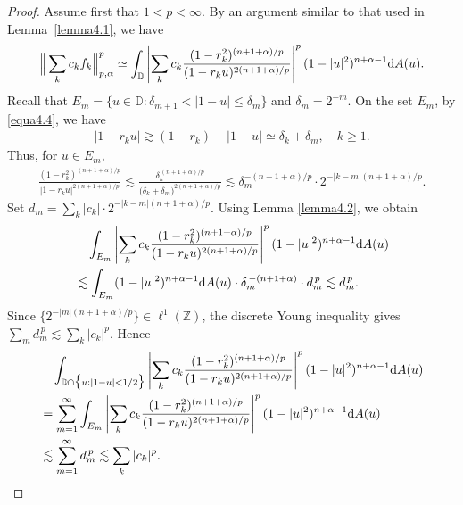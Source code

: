 \documentclass[preprint,12pt,times]{elsarticle}
\theoremstyle{definition}
\theoremstyle{remark}
\numberwithin{equation}{section}
\begin{document}
\begin{proof}
 Assume first that $1<p<\infty$.
 By an argument similar to that used in Lemma~\ref{lemma4.1}, we have
\begin{align}\label{equa4.6}
\Big\|\sum_{k}c_kf_k\Big\|_{p,\alpha}^p\simeq \int_{\mathbb{D}}\left|\sum_{k}c_k\frac{(1-r_k^2)^{(n+1+\alpha)/p}}{(1-r_k u)^{2(n+1+\alpha)/p}}\right|^p(1-|u|^2)^{n+\alpha-1}{\rm d}A(u).
\end{align}
Recall that $E_m=\{u\in\mathbb{D}: \delta_{m+1}<|1-u|\leq \delta_m\}$ and $\delta_m=2^{-m}$. On the set $E_m$, by \eqref{equa4.4}, we have
\begin{align*}
|1-r_k u|\gtrsim (1-r_k)+|1-u|\simeq \delta_k+\delta_m,\quad k\geq 1.
\end{align*}
Thus, for $u\in E_m$,
\begin{align*}
\frac{(1-r_k^2)^{(n+1+\alpha)/p}}{|1-r_k u|^{2(n+1+\alpha)/p}}\lesssim \frac{\delta_k^{\,(n+1+\alpha)/p}}{\big(\delta_k+\delta_m\big)^{2(n+1+\alpha)/p}}\lesssim \delta_m^{-(n+1+\alpha)/p}\cdot 2^{-|k-m|(n+1+\alpha)/p}.
\end{align*}
Set $d_m=\sum\limits_{k}|c_k|\cdot 2^{-|k-m|(n+1+\alpha)/p}$. 
Using Lemma \ref{lemma4.2}, we obtain
\begin{equation*}
\begin{split}
&\quad \int_{E_m}\left|\sum_{k}c_k\frac{(1-r_k^2)^{(n+1+\alpha)/p}}{(1-r_ku)^{2(n+1+\alpha)/p}}\right|^p(1-|u|^2)^{n+\alpha-1}{\rm d}A(u)\\
&\lesssim \int_{E_m}(1-|u|^2)^{n+\alpha-1}{\rm d}A(u)\cdot \delta_m^{\,-(n+1+\alpha)}\cdot d_m^{\,p}\lesssim d_m^{\,p}.
\end{split}
\end{equation*}
Since $\big\{2^{-|m|(n+1+\alpha)/p}\big\}\in \ell^1(\mathbb{Z})$, the discrete Young inequality gives $\sum_{m}d_m^{\,p}\lesssim \sum_{k}|c_k|^p$.
Hence 
\begin{equation}\label{equa4.7}
\begin{split}
&\quad \int_{\mathbb{D}\cap\big\{u: |1-u|<1/2\big\}}\left|\sum_{k}c_k\frac{(1-r_k^2)^{(n+1+\alpha)/p}}{(1-r_ku)^{2(n+1+\alpha)/p}}\right|^p(1-|u|^2)^{n+\alpha-1}{\rm d}A(u)\\
&=\sum_{m=1}^{\infty}\int_{E_m}\left|\sum_{k}c_k\frac{(1-r_k^2)^{(n+1+\alpha)/p}}{(1-r_ku)^{2(n+1+\alpha)/p}}\right|^p(1-|u|^2)^{n+\alpha-1}{\rm d}A(u)\\
&\lesssim \sum_{m=1}^{\infty}d_m^{\,p}\lesssim \sum_{k}|c_k|^p.
\end{split}
\end{equation}


\end{proof}
\end{document}
